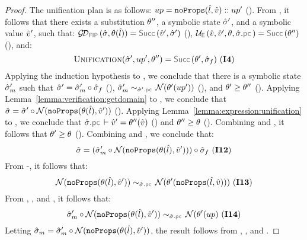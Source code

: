\begin{proof}
\noindent {} The unification plan is as follows: 
$up = \texttt{noProps}(\hat{l}, \hat{v}) :: up'$ (). 
From , it follows that there exists a substitution $\theta''$, a symbolic state $\hat{\sigma}'$, 
and a symbolic value $\hat{v}'$, such that: 
$\GetDomainV{\sstate, \subst(\sloc)} = \success{\sexprv', \sstate'}$ (), 
$\unifylexpr(\sexprv, \sexprv', \subst, \sstate.\pcsel) = \success{\subst''}$ (), and: 
$$
\unificationfunction(\sstate', \up', \subst'') = \success{\subst', \sstate_f} \text{ (\ieq{4})}
$$
Applying the induction hypothesis to , we conclude that there is a symbolic state 
$\hat{\sigma}_m'$ such that  $\hat{\sigma}' = \hat{\sigma}_m' \circ \hat{\sigma}_f$ (), 
$\stateequivrel{\sstate_m'}{\normaliser(\subst'(\up'))}{\sstate'.\pcsel}$ (), and $\theta' \geq \theta''$ (). 
%
Applying Lemma~\ref{lemma:verification:getdomain} to , we conclude that 
$\hat{\sigma} = \hat{\sigma}' \circ \mathcal{N}(\texttt{noProps}(\theta(\hat{l}), \hat{v}'))$ (). 
%
Applying Lemma~\ref{lemma:expression:unification} to , we conclude that 
$\sstate.\pcsel \vdash \sexprv' = \subst''(\sexprv)$ () and $\theta'' \geq \theta$ (). 
%
Combining  and , it follows that $\theta' \geq \theta$ (). 
%
Combining  and , we conclude that: 
$$
\hat{\sigma} = (\hat{\sigma}_m' \circ \mathcal{N}(\texttt{noProps}(\theta(\hat{l}), \hat{v}'))) \circ \hat{\sigma}_f  \text{ ({\bf I12})}
$$
From -, it follows that: 
$$
\stateequivrel{\normaliser(\emptyfields{\subst(\sloc)}{\sexprv'})}{\normaliser(\subst'(\emptyfields{\sloc}{\sexprv}))}{\sstate.\pcsel} \text{ (\ieq{13})}
$$
From , , and , it follows that: 
$$
\stateequivrel{\sstate_m' \statecompose \normaliser(\emptyfields{\subst(\sloc)}{\sexprv'})}{\normaliser(\subst'(\up)}{\sstate.\pcsel} \text{ (\ieq{14})}
$$
Letting $\hat{\sigma}_m = \hat{\sigma}_m' \circ \mathcal{N}(\texttt{noProps}(\theta(\hat{l}), \hat{v}'))$, the result follows 
from , , and . 
\vspace{5pt}



\end{proof}
